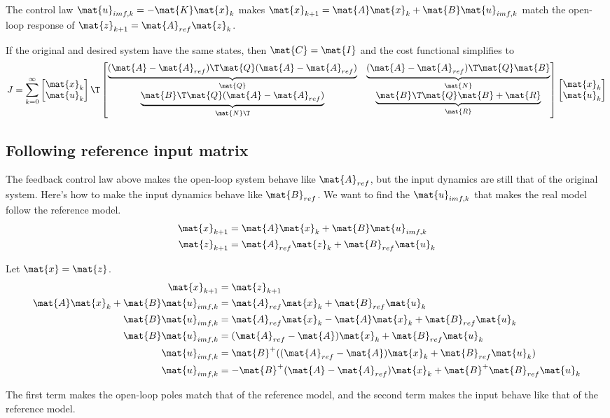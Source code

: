 The control law $\mat{u}_{imf,k} = -\mat{K}\mat{x}_k$ makes
$\mat{x}_{k+1} = \mat{A}\mat{x}_k + \mat{B}\mat{u}_{imf,k}$ match the open-loop
response of $\mat{z}_{k+1} = \mat{A}_{ref}\mat{z}_k$.

If the original and desired system have the same states, then
$\mat{C} = \mat{I}$ and the cost functional simplifies to
\begin{equation}
  J = \sum_{k=0}^\infty
  \begin{bmatrix}
    \mat{x}_k \\
    \mat{u}_k
  \end{bmatrix}\T
  \begin{bmatrix}
    \underbrace{(\mat{A} - \mat{A}_{ref})\T\mat{Q}
      (\mat{A} - \mat{A}_{ref})}_{\mat{Q}} &
    \underbrace{(\mat{A} - \mat{A}_{ref})\T\mat{Q}\mat{B}}_{\mat{N}} \\
    \underbrace{\mat{B}\T\mat{Q}(\mat{A} - \mat{A}_{ref})}_{\mat{N}\T} &
    \underbrace{\mat{B}\T\mat{Q}\mat{B} + \mat{R}}_{\mat{R}}
  \end{bmatrix}
  \begin{bmatrix}
    \mat{x}_k \\
    \mat{u}_k
  \end{bmatrix}
\end{equation}

\subsection{Following reference input matrix}

The feedback control law above makes the open-loop system behave like
$\mat{A}_{ref}$, but the input dynamics are still that of the original system.
Here's how to make the input dynamics behave like $\mat{B}_{ref}$. We want to
find the $\mat{u}_{imf,k}$ that makes the real model follow the reference model.
\begin{align*}
  \mat{x}_{k+1} &= \mat{A}\mat{x}_k + \mat{B}\mat{u}_{imf,k} \\
  \mat{z}_{k+1} &= \mat{A}_{ref}\mat{z}_k + \mat{B}_{ref}\mat{u}_k
\end{align*}

Let $\mat{x} = \mat{z}$.
\begin{align*}
  \mat{x}_{k+1} &= \mat{z}_{k+1} \\
  \mat{A}\mat{x}_k + \mat{B}\mat{u}_{imf,k} &= \mat{A}_{ref}\mat{x}_k +
    \mat{B}_{ref}\mat{u}_k \\
  \mat{B}\mat{u}_{imf,k} &= \mat{A}_{ref}\mat{x}_k - \mat{A}\mat{x}_k +
    \mat{B}_{ref}\mat{u}_k \\
  \mat{B}\mat{u}_{imf,k} &= (\mat{A}_{ref} - \mat{A})\mat{x}_k +
    \mat{B}_{ref}\mat{u}_k \\
  \mat{u}_{imf,k} &= \mat{B}^+ ((\mat{A}_{ref} - \mat{A})\mat{x}_k +
    \mat{B}_{ref}\mat{u}_k) \\
  \mat{u}_{imf,k} &= -\mat{B}^+ (\mat{A} - \mat{A}_{ref})\mat{x}_k +
    \mat{B}^+ \mat{B}_{ref}\mat{u}_k
\end{align*}

The first term makes the open-loop poles match that of the reference model, and
the second term makes the input behave like that of the reference model.
